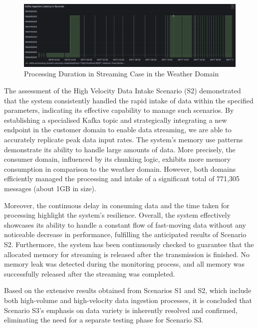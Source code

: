 \documentclass[preprint,12pt]{elsarticle}
\begin{document}
\begin{figure}

  \centering

  \includegraphics[width=\textwidth]{images/processing-duration-streaming-case-in-weather-domain.png}

  \caption{Processing Duration in Streaming Case in the Weather Domain}

  \label{processingDurationInStreamingCaseInWeatherDomain}

\end{figure}

The assessment of the High Velocity Data Intake Scenario (S2) demonstrated that the system consistently handled the rapid intake of data within the specified parameters, indicating its effective capability to manage such scenarios. By establishing a specialised Kafka topic and strategically integrating a new endpoint in the customer domain to enable data streaming, we are able to accurately replicate peak data input rates. The system's memory use patterns demonstrate its ability to handle large amounts of data. More precisely, the consumer domain, influenced by its chunking logic, exhibits more memory consumption in comparison to the weather domain. However, both domains efficiently managed the processing and intake of a significant total of 771,305 messages (about 1GB in size). 

Moreover, the continuous delay in consuming data and the time taken for processing highlight the system's resilience. Overall, the system effectively showcases its ability to handle a constant flow of fast-moving data without any noticeable decrease in performance, fulfilling the anticipated results of Scenario S2. Furthermore, the system has been continuously checked to guarantee that the allocated memory for streaming is released after the transmission is finished. No memory leak was detected during the monitoring process, and all memory was successfully released after the streaming was completed.

Based on the extensive results obtained from Scenarios S1 and S2, which include both high-volume and high-velocity data ingestion processes, it is concluded that Scenario S3's emphasis on data variety is inherently resolved and confirmed, eliminating the need for a separate testing phase for Scenario S3.
\end{document}
